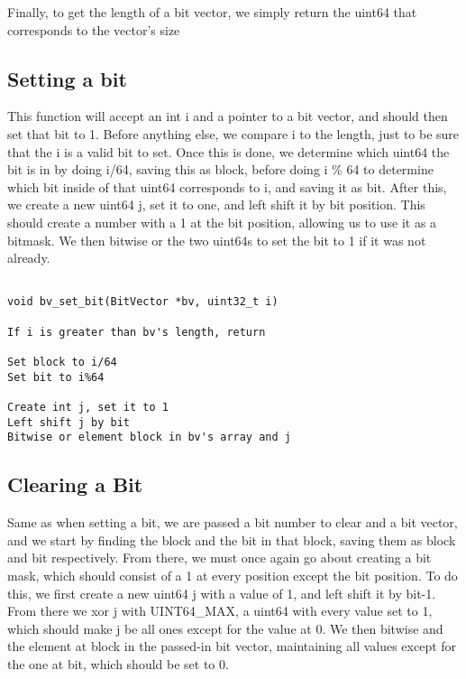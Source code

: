 \documentclass[11pt]{article}
\begin{document}
Finally, to get the length of a bit vector, we simply return the uint64 that corresponds to the vector's size

\subsection{Setting a bit}

This function will accept an int i and a pointer to a bit vector, and should then set that bit to 1. Before anything else, we compare i to the length, just to be sure that the i is a valid bit to set. Once this is done, we determine which uint64 the bit is in by doing i/64, saving this as block, before doing i \% 64 to determine which bit inside of that uint64 corresponds to i, and saving it as bit. After this, we create a new uint64 j, set it to one, and left shift it by bit position. This should create a number with a 1 at the bit position, allowing us to use it as a bitmask. We then bitwise or the two uint64s to set the bit to 1 if it was not already.

\begin{verbatim}

void bv_set_bit(BitVector *bv, uint32_t i)

If i is greater than bv's length, return

Set block to i/64
Set bit to i%64

Create int j, set it to 1
Left shift j by bit
Bitwise or element block in bv's array and j

\end{verbatim}

\subsection{Clearing a Bit}

Same as when setting a bit, we are passed a bit number to clear and a bit vector, and we start by finding the block and the bit in that block, saving them as block and bit respectively. From there, we must once again go about creating a bit mask, which should consist of a 1 at every position except the bit position. To do this, we first create a new uint64 j with a value of 1, and left shift it by bit-1. From there we xor j with UINT64\_MAX, a uint64 with every value set to 1, which should make j be all ones except for the value at 0. We then bitwise and the element at block in the passed-in bit vector, maintaining all values except for the one at bit, which should be set to 0.
\end{document}
